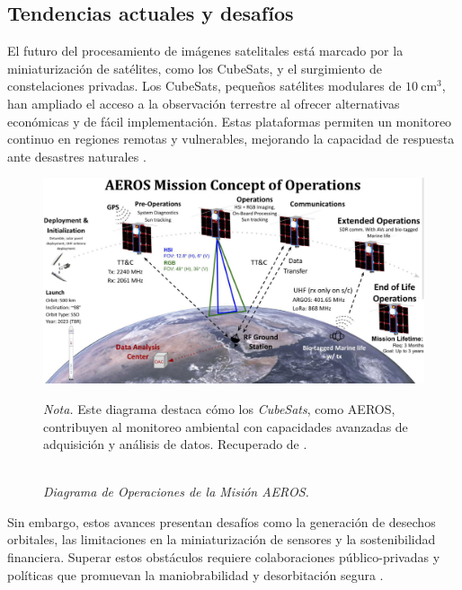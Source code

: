     \subsection{Tendencias actuales y desafíos}

        El futuro del procesamiento de imágenes satelitales está marcado por la miniaturización de satélites, como los CubeSats, y el surgimiento de constelaciones privadas. Los CubeSats, pequeños satélites modulares de $10~\text{cm}^3$, han ampliado el acceso a la observación terrestre al ofrecer alternativas económicas y de fácil implementación. Estas plataformas permiten un monitoreo continuo en regiones remotas y vulnerables, mejorando la capacidad de respuesta ante desastres naturales \autocite{santilli2016disaster}.
        

        \begin{figure}[H] 
            \caption{\doublespacing \\ \textit{Diagrama de Operaciones de la Misión AEROS.}} 
            \centering
            \includegraphics[width=1\linewidth]{images/aeros.png}
            \begin{justify}
                \textit{Nota.} Este diagrama destaca cómo los \textit{CubeSats}, como AEROS, contribuyen al monitoreo ambiental con capacidades avanzadas de adquisición y análisis de datos. Recuperado de \textcite{prendergast2022aeros}.
            \end{justify}                    
            \label{fig:aeros}
        \end{figure}

        Sin embargo, estos avances presentan desafíos como la generación de desechos orbitales, las limitaciones en la miniaturización de sensores y la sostenibilidad financiera. Superar estos obstáculos requiere colaboraciones público-privadas y políticas que promuevan la maniobrabilidad y desorbitación segura \autocite{denis2017towards}.
        

